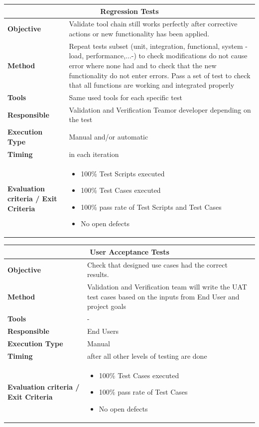 \begin{center}
\begin{longtable}[H]{|p{4cm}|p{9cm}|}\hline
\multicolumn{2}{|c|}{\textbf{Regression Tests}}\\\hline
\textbf{Objective} &  Validate tool chain still works perfectly after corrective actions or new functionality has been applied.\\\hline
\textbf{Method} & Repeat tests subset (unit, integration, functional, system -load, performance,...-) to check modifications do not cause error where none had and to check that the new functionality do not enter errors. Pass a set of test to check that all functions are working and integrated properly \\\hline
\textbf{Tools} & Same used tools for each specific test\\\hline
\textbf{Responsible} & Validation and Verification Teamor developer depending on the test\\\hline
\textbf{Execution Type} & Manual and/or automatic\\\hline
\textbf{Timing} & in each iteration \\\hline
\textbf{Evaluation criteria / Exit Criteria} & \begin{itemize}
\item 100\% Test Scripts executed
\item 100\% Test Cases executed
\item 100\% pass rate of Test Scripts and Test Cases
\item No open defects
\end{itemize} \\\hline
\end{longtable}
\end{center}

\begin{center}
\begin{longtable}[H]{|p{4cm}|p{9cm}|}\hline
\multicolumn{2}{|c|}{\textbf{User Acceptance Tests}}\\\hline
\textbf{Objective} &  Check that designed use cases had the correct results.\\\hline
\textbf{Method} & Validation and Verification team will write the UAT test cases based on the inputs from End User and project goals \\\hline
\textbf{Tools} & -\\\hline
\textbf{Responsible} & End Users\\\hline
\textbf{Execution Type} & Manual\\\hline
\textbf{Timing} & after all other levels of testing are done \\\hline
\textbf{Evaluation criteria / Exit Criteria} & \begin{itemize}
\item 100\% Test Cases executed
\item 100\% pass rate of Test Cases
\item No open defects
\end{itemize} \\\hline
\end{longtable}
\end{center}

